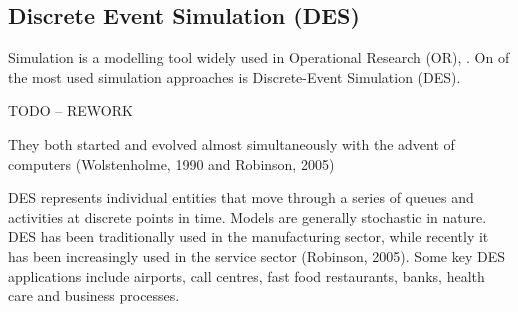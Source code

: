 \subsection{Discrete Event Simulation (DES)}
Simulation is a modelling tool widely used in Operational Research (OR), \cite{pidd2005computer}. On of the most used simulation approaches is Discrete-Event Simulation (DES).


TODO -- REWORK




They both started and evolved almost simultaneously with the advent of computers (Wolstenholme, 1990 and Robinson, 2005)

 DES represents individual entities that move through a series of queues and activities at discrete points in time. Models are generally stochastic in nature. DES has been traditionally used in the manufacturing sector, while recently it has been increasingly used in the service sector (Robinson, 2005). Some key DES applications include airports, call centres, fast food restaurants, banks, health care and business processes.






